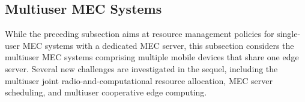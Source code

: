 \documentclass[journal]{IEEEtran}
\begin{document}
{{%
}}
\subsection{Multiuser MEC Systems}

While the preceding subsection aims at resource management policies for single-user MEC systems with a dedicated MEC server, this subsection considers the multiuser MEC systems comprising multiple mobile devices that share one edge server. Several new challenges are investigated in the sequel, including the multiuser joint radio-and-computational resource allocation, MEC server scheduling, and multiuser cooperative edge computing.
\end{document}

